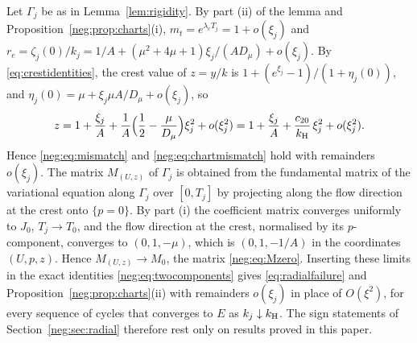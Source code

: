 \begin{remark}\label{neg:rem:selfcontained}
Let $\Gamma_j$ be as in Lemma~\ref{lem:rigidity}. By part (ii) of the lemma and Proposition~\ref{neg:prop:charts}(i), $m_t=e^{\lambda_cT_j}=1+o(\xi_j)$ and $r_e=\zeta_j(0)/k_j=1/A+(\mu^2+4\mu+1)\xi_j/(AD_\mu)+o(\xi_j)$. By \eqref{eq:crestidentities}, the crest value of $z=y/k$ is $1+(e^{\xi_j}-1)/(1+\eta_j(0))$, and $\eta_j(0)=\mu+\xi_j\mu A/D_\mu+o(\xi_j)$, so
\[
z=1+\frac{\xi_j}{A}+\frac1A\Bigl(\frac12-\frac{\mu}{D_\mu}\Bigr)\xi_j^2+o(\xi_j^2)=1+\frac{\xi_j}{A}+\frac{c_{20}}{k_{\mathrm H}}\,\xi_j^2+o(\xi_j^2).
\]
Hence \eqref{neg:eq:mismatch} and \eqref{neg:eq:chartmismatch} hold with remainders $o(\xi_j)$. The matrix $M_{(U,z)}$ of $\Gamma_j$ is obtained from the fundamental matrix of the variational equation along $\Gamma_j$ over $[0,T_j]$ by projecting along the flow direction at the crest onto $\{p=0\}$. By part (i) the coefficient matrix converges uniformly to $J_0$, $T_j\to T_0$, and the flow direction at the crest, normalised by its $p$-component, converges to $(0,1,-\mu)$, which is $(0,1,-1/A)$ in the coordinates $(U,p,z)$. Hence $M_{(U,z)}\to M_0$, the matrix \eqref{neg:eq:Mzero}. Inserting these limits in the exact identities \eqref{neg:eq:twocomponents} gives \eqref{eq:radialfailure} and Proposition~\ref{neg:prop:charts}(ii) with remainders $o(\xi_j)$ in place of $O(\xi^2)$, for every sequence of cycles that converges to $E$ as $k_j\downarrow k_{\mathrm H}$. The sign statements of Section~\ref{neg:sec:radial} therefore rest only on results proved in this paper.
\end{remark}

